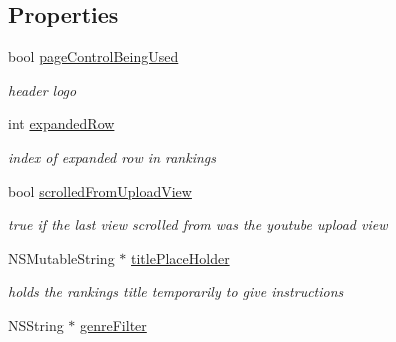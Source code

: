 \subsection*{Properties}
\begin{DoxyCompactItemize}
\item 
bool \hyperlink{interface_c_b_h_view_controller_a1e5f8bdce0cf68537c06544ac6561b6c}{page\-Control\-Being\-Used}
\begin{DoxyCompactList}\small\item\em header logo \end{DoxyCompactList}\item 
\hypertarget{interface_c_b_h_view_controller_ac03926dde3bbcf5a9c031e7ec298cf0c}{int \hyperlink{interface_c_b_h_view_controller_ac03926dde3bbcf5a9c031e7ec298cf0c}{expanded\-Row}}\label{interface_c_b_h_view_controller_ac03926dde3bbcf5a9c031e7ec298cf0c}

\begin{DoxyCompactList}\small\item\em index of expanded row in rankings \end{DoxyCompactList}\item 
\hypertarget{interface_c_b_h_view_controller_af2c6cc727067f7bf54346e7e3b8c9332}{bool \hyperlink{interface_c_b_h_view_controller_af2c6cc727067f7bf54346e7e3b8c9332}{scrolled\-From\-Upload\-View}}\label{interface_c_b_h_view_controller_af2c6cc727067f7bf54346e7e3b8c9332}

\begin{DoxyCompactList}\small\item\em true if the last view scrolled from was the youtube upload view \end{DoxyCompactList}\item 
\hypertarget{interface_c_b_h_view_controller_ad79fef662466006ac26d715aebb30cef}{N\-S\-Mutable\-String $\ast$ \hyperlink{interface_c_b_h_view_controller_ad79fef662466006ac26d715aebb30cef}{title\-Place\-Holder}}\label{interface_c_b_h_view_controller_ad79fef662466006ac26d715aebb30cef}

\begin{DoxyCompactList}\small\item\em holds the rankings title temporarily to give instructions \end{DoxyCompactList}\item 
\hypertarget{interface_c_b_h_view_controller_abb1a225a470d297a619e90f18fd300cf}{N\-S\-String $\ast$ \hyperlink{interface_c_b_h_view_controller_abb1a225a470d297a619e90f18fd300cf}{genre\-Filter}}\label{interface_c_b_h_view_controller_abb1a225a470d297a619e90f18fd300cf}


\end{DoxyCompactItemize}
